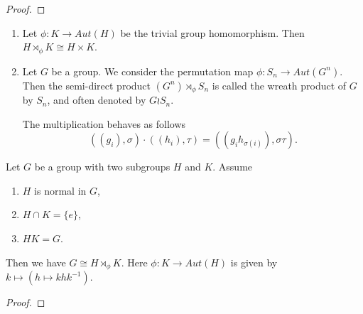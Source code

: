 \begin{proof}

\end{proof}
\begin{example}
    \begin{enumerate}
        \item   Let $\phi: K \rightarrow Aut(H)$ be the trivial group homomorphism. Then $H \rtimes_\phi K \cong H \times K$.
        \item Let $G$ be a group. We consider the permutation map $\phi: S_n \rightarrow Aut(G^n)$. Then the semi-direct product $(G^n) \rtimes_\phi S_n$ is called the wreath product of $G$ by $S_n$, and often denoted by $G \wr S_n$.

              The multiplication behaves as follows
              \[
                  ((g_i), \sigma) \cdot ((h_i), \tau) = ((g_i h_{\sigma(i)}), \sigma\tau).
              \]
    \end{enumerate}
\end{example}
\begin{prop}
    Let $G$ be a group with two subgroups $H$ and $K$. Assume
    \begin{enumerate}
        \item $H$ is normal in $G$,
        \item $H \cap K = \{e\}$,
        \item $HK = G$.
    \end{enumerate}
    Then we have $G \cong H \rtimes_\phi K$. Here $\phi: K \rightarrow Aut(H)$ is given by $k \mapsto (h \mapsto k h k^{-1})$.
\end{prop}
\begin{proof}

\end{proof}


